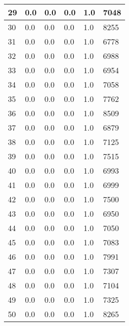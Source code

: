 \begin{longtable}{|l|l|l|l|l|l|}
29 & 0.0 & 0.0 & 0.0 & 1.0 & 7048 \\ \hline 
30 & 0.0 & 0.0 & 0.0 & 1.0 & 8255 \\ \hline 
31 & 0.0 & 0.0 & 0.0 & 1.0 & 6778 \\ \hline 
32 & 0.0 & 0.0 & 0.0 & 1.0 & 6988 \\ \hline 
33 & 0.0 & 0.0 & 0.0 & 1.0 & 6954 \\ \hline 
34 & 0.0 & 0.0 & 0.0 & 1.0 & 7058 \\ \hline 
35 & 0.0 & 0.0 & 0.0 & 1.0 & 7762 \\ \hline 
36 & 0.0 & 0.0 & 0.0 & 1.0 & 8509 \\ \hline 
37 & 0.0 & 0.0 & 0.0 & 1.0 & 6879 \\ \hline 
38 & 0.0 & 0.0 & 0.0 & 1.0 & 7125 \\ \hline 
39 & 0.0 & 0.0 & 0.0 & 1.0 & 7515 \\ \hline 
40 & 0.0 & 0.0 & 0.0 & 1.0 & 6993 \\ \hline 
41 & 0.0 & 0.0 & 0.0 & 1.0 & 6999 \\ \hline 
42 & 0.0 & 0.0 & 0.0 & 1.0 & 7500 \\ \hline 
43 & 0.0 & 0.0 & 0.0 & 1.0 & 6950 \\ \hline 
44 & 0.0 & 0.0 & 0.0 & 1.0 & 7050 \\ \hline 
45 & 0.0 & 0.0 & 0.0 & 1.0 & 7083 \\ \hline 
46 & 0.0 & 0.0 & 0.0 & 1.0 & 7991 \\ \hline 
47 & 0.0 & 0.0 & 0.0 & 1.0 & 7307 \\ \hline 
48 & 0.0 & 0.0 & 0.0 & 1.0 & 7104 \\ \hline 
49 & 0.0 & 0.0 & 0.0 & 1.0 & 7325 \\ \hline 
50 & 0.0 & 0.0 & 0.0 & 1.0 & 8265 \\ \hline 
\end{longtable}